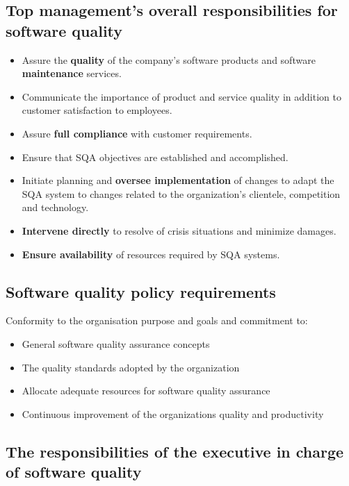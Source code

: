 \documentclass{article}
\begin{document}
\subsection{Top management’s overall responsibilities for software quality}

\begin{itemize}
  \item Assure the \textbf{quality} of the company’s software products and software \textbf{maintenance} services.
  \item Communicate the importance of product and service quality in addition to customer satisfaction to employees.
  \item Assure \textbf{full compliance} with customer requirements.
  \item Ensure that SQA objectives are established and accomplished.
  \item Initiate planning and \textbf{oversee implementation} of changes to adapt the SQA system to changes related to the organization's clientele, competition and technology.
  \item \textbf{Intervene directly} to resolve of crisis situations and minimize damages.
  \item \textbf{Ensure availability} of resources required by SQA systems.
\end{itemize}

\subsection{Software quality policy requirements}

\begin{flushleft}
Conformity to the organisation purpose and goals and commitment to:
\begin{itemize}
  \item General software quality assurance concepts
  \item The quality standards adopted by the organization
  \item Allocate adequate resources for software quality assurance
  \item Continuous improvement of the organizations quality and productivity
\end{itemize}
\end{flushleft}

\subsection{The responsibilities of the executive in charge of software quality}
\end{document}
